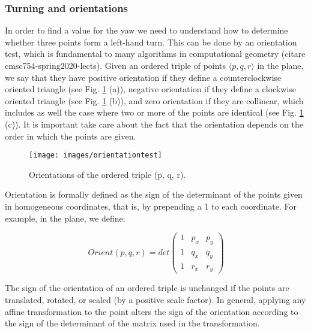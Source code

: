 \subsubsection{Turning and orientations}
\label{subsec:orientationtest}
In order to find a value for the yaw we need to understand how to determine whether three points form a left-hand turn. This can be done by an orientation test, which is fundamental to many algorithms in computational geometry (citare cmsc754-spring2020-lects). Given an ordered triple of points $\langle p, q, r \rangle$ in the plane, we say that they have positive orientation if they define a counterclockwise oriented triangle (see Fig. \ref{fig:orientationtest} (a)), negative orientation if they define a clockwise oriented triangle (see Fig. \ref{fig:orientationtest} (b)), and zero orientation if they are collinear, which includes as well the case where two or more of the points are identical (see Fig. \ref{fig:orientationtest} (c)). It is important take care about the fact that the orientation depends on the order in which the points are given.

\begin{figure}[H]
	\centering
	\texttt{[image: images/orientationtest]}
	\caption[Orientation test.]{Orientations of the ordered triple (p, q, r).}
	\label{fig:orientationtest}
\end{figure}

\noindent Orientation is formally defined as the sign of the determinant of the points given in homogeneous coordinates, that is, by prepending a 1 to each coordinate. For example, in the plane, we define:

\begin{Equation}[!htb]
	\centering
	\begin{equation} \label{eq:orientationtest}
		Orient(p,q,r) = det
		\begin{pmatrix}
		1 & p_x & p_y \\
		1 & q_x & q_y \\
		1 & r_x & r_y 
		\end{pmatrix}
		\end{equation}
	\caption[Orientation test.]{Thus orientation generalizes the familiar 1-dimensional binary relations $<, =, >$.}
\end{Equation}

\noindent The sign of the orientation of an ordered triple is unchanged if the points are translated, rotated, or scaled (by a positive scale factor). In general, applying any affine transformation to the point alters the sign of the orientation according to the sign of the determinant of the matrix used in the transformation. \\

